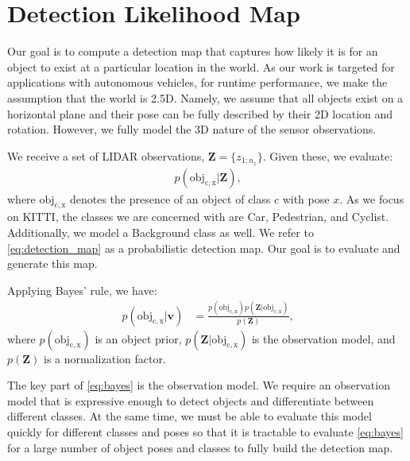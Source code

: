 \section{Detection Likelihood Map}\label{sec:dlm}

Our goal is to compute a detection map that captures how likely it is for an
object to exist at a particular location in the world. As our work is targeted
for applications with autonomous vehicles, for runtime performance, we make the
assumption that the world is 2.5D. Namely, we assume that all objects exist on a
horizontal plane and their pose can be fully described by their 2D location and
rotation. However, we fully model the 3D nature of the sensor observations.

We receive a set of \ac{LIDAR} observations, $\mathbf{Z} = \{z_{1:n_z}\}$. Given
these, we evaluate:
%
\begin{align}
  p(\mathrm{obj_{c, x}}| \mathbf{Z}) \text{,} \label{eq:detection_map}
\end{align}
%
where $\mathrm{obj_{c, x}}$ denotes the presence of an object of class $c$ with
pose $x$. As we focus on KITTI, the classes we are concerned with are Car,
Pedestrian, and Cyclist. Additionally, we model a Background class as well. We
refer to \eqref{eq:detection_map} as a probabilistic detection map. Our goal is
to evaluate and generate this map.

Applying Bayes' rule, we have:
%
\begin{align}
  p(\mathrm{obj_{c, x}} | \mathbf{v}) &=
    \frac
      {p(\mathrm{obj_{c, x}}) p(\mathbf{Z} | \mathrm{obj_{c, x}})}
      {p(\mathbf{Z})}
  \text{,}
  \label{eq:bayes}
\end{align}
%
where $p(\mathrm{obj_{c, x}})$ is an object prior,
$p(\mathbf{Z} | \mathrm{obj_{c, x}})$ is the observation model, and
$p(\mathbf{Z})$ is a normalization factor.

The key part of \eqref{eq:bayes} is the observation model. We require an
observation model that is expressive enough to detect objects and differentiate
between different classes. At the same time, we must be able to evaluate this
model quickly for different classes and poses so that it is tractable to
evaluate \eqref{eq:bayes} for a large number of object poses and classes to
fully build the detection map.
